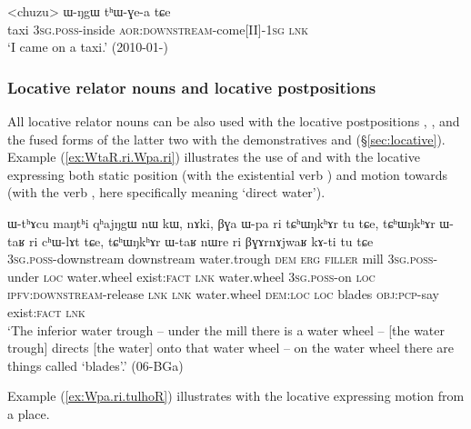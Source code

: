 \begin{exe}
\ex \label{ex:chuzu.WNgW}
\gll  <chuzu> ɯ-ŋgɯ tʰɯ-ɣe-a tɕe \\
taxi \textsc{3sg}.\textsc{poss}-inside \textsc{aor}:\textsc{downstream}-come[II]-\textsc{1sg} \textsc{lnk} \\
\glt `I came on a taxi.' (2010-01-)
\end{exe} 



\subsubsection{Locative relator nouns and locative postpositions} \label{sec:relator.postposition.location}
 All locative relator nouns can be also used with the locative postpositions , ,  and the fused forms of the latter two with the demonstratives  and  (§\ref{sec:locative}). Example (\ref{ex:WtaR.ri.Wpa.ri}) illustrates the use of  and  with the locative  expressing both static position (with the existential verb ) and motion towards (with the verb , here specifically meaning `direct water').

\begin{exe}
\ex \label{ex:WtaR.ri.Wpa.ri}
\gll ɯ-tʰɤcu maŋtʰi qʰajŋgɯ nɯ kɯ, nɤki, βɣa ɯ-pa ri tɕʰɯŋkʰɤr tu tɕe, tɕʰɯŋkʰɤr ɯ-taʁ ri cʰɯ-lɤt tɕe, tɕʰɯŋkʰɤr ɯ-taʁ nɯre ri βɣɤrnɤjwaʁ kɤ-ti tu tɕe \\
\textsc{3sg}.\textsc{poss}-downstream downstream water.trough \textsc{dem} \textsc{erg} \textsc{filler} mill \textsc{3sg}.\textsc{poss}-under \textsc{loc} water.wheel exist:\textsc{fact} \textsc{lnk} water.wheel \textsc{3sg}.\textsc{poss}-on \textsc{loc} \textsc{ipfv}:\textsc{downstream}-release \textsc{lnk} \textsc{lnk} water.wheel \textsc{dem}:\textsc{loc} \textsc{loc} blades \textsc{obj}:\textsc{pcp}-say exist:\textsc{fact} \textsc{lnk} \\
\glt `The inferior water trough -- under the mill there is a water wheel -- [the water trough] directs [the water] onto that water wheel -- on the water wheel there are things called `blades'.' (06-BGa) 	
\end{exe}

Example (\ref{ex:Wpa.ri.tulhoR}) illustrates  with the locative  expressing motion from a place.

